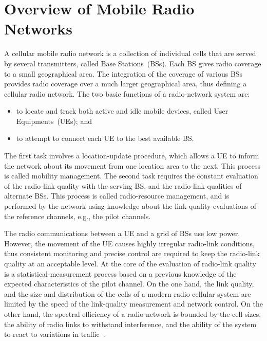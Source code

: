 \chapter{Overview of Mobile Radio Networks \label{chap:02-Principles_of_mobile_radio_networks}}

A cellular mobile radio network is a collection of individual cells
that are served by several transmitters, called Base Stations~(BSs).
Each BS gives radio coverage to a small geographical area. The integration
of the coverage of various BSs provides radio coverage over a much
larger geographical area, thus defining a cellular radio network.
The two basic functions of a radio-network system are: 
\begin{itemize}
\item to locate and track both active and idle mobile devices, called User
Equipments~(UEs); and
\item to attempt to connect each UE to the best available BS.
\end{itemize}
The first task involves a location-update procedure, which allows
a UE to inform the network about its movement from one location area
to the next. This process is called mobility management. The second
task requires the constant evaluation of the radio-link quality with
the serving BS, and the radio-link qualities of alternate BSs. This
process is called radio-resource management, and is performed by the
network using knowledge about the link-quality evaluations of the
reference channels, e.g., the pilot channels.

The radio communications between a UE and a grid of BSs use low power.
However, the movement of the UE causes highly irregular radio-link
conditions, thus consistent monitoring and precise control are required
to keep the radio-link quality at an acceptable level. At the core
of the evaluation of radio-link quality is a statistical-measurement
process based on a previous knowledge of the expected characteristics
of the pilot channel. On the one hand, the link quality, and the size
and distribution of the cells of a modern radio cellular system are
limited by the speed of the link-quality measurement and network control.
On the other hand, the spectral efficiency of a radio network is bounded
by the cell sizes, the ability of radio links to withstand interference,
and the ability of the system to react to variations in traffic~\cite{Stuber-Principles_of_mobile_communication:2011}.

